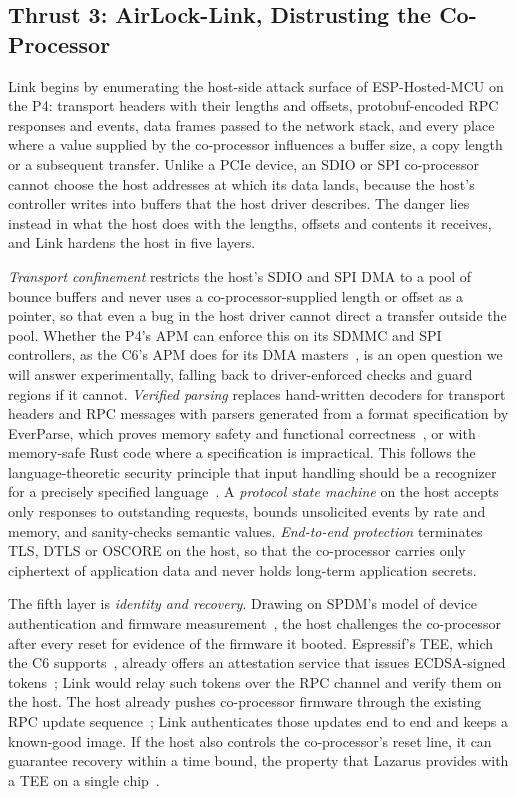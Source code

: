 \documentclass[conference,10pt]{IEEEtran}
\begin{document}
\subsection{Thrust 3: AirLock-Link, Distrusting the Co-Processor}

Link begins by enumerating the host-side attack surface of ESP-Hosted-MCU on the P4: transport headers with their lengths and offsets, protobuf-encoded RPC responses and events, data frames passed to the network stack, and every place where a value supplied by the co-processor influences a buffer size, a copy length or a subsequent transfer. Unlike a PCIe device, an SDIO or SPI co-processor cannot choose the host addresses at which its data lands, because the host's controller writes into buffers that the host driver describes. The danger lies instead in what the host does with the lengths, offsets and contents it receives, and Link hardens the host in five layers.

\emph{Transport confinement} restricts the host's SDIO and SPI DMA to a pool of bounce buffers and never uses a co-processor-supplied length or offset as a pointer, so that even a bug in the host driver cannot direct a transfer outside the pool. Whether the P4's APM can enforce this on its SDMMC and SPI controllers, as the C6's APM does for its DMA masters~\cite{esptee}, is an open question we will answer experimentally, falling back to driver-enforced checks and guard regions if it cannot. \emph{Verified parsing} replaces hand-written decoders for transport headers and RPC messages with parsers generated from a format specification by EverParse, which proves memory safety and functional correctness~\cite{ramananandro2019everparse,swamy2022everparse3d}, or with memory-safe Rust code where a specification is impractical. This follows the language-theoretic security principle that input handling should be a recognizer for a precisely specified language~\cite{sassaman2011halting}. A \emph{protocol state machine} on the host accepts only responses to outstanding requests, bounds unsolicited events by rate and memory, and sanity-checks semantic values. \emph{End-to-end protection} terminates TLS, DTLS or OSCORE on the host, so that the co-processor carries only ciphertext of application data and never holds long-term application secrets.

The fifth layer is \emph{identity and recovery}. Drawing on SPDM's model of device authentication and firmware measurement~\cite{dmtf2023spdm}, the host challenges the co-processor after every reset for evidence of the firmware it booted. Espressif's TEE, which the C6 supports~\cite{espsecframeworks}, already offers an attestation service that issues ECDSA-signed tokens~\cite{espteeguide}; Link would relay such tokens over the RPC channel and verify them on the host. The host already pushes co-processor firmware through the existing RPC update sequence~\cite{esphostedota}; Link authenticates those updates end to end and keeps a known-good image. If the host also controls the co-processor's reset line, it can guarantee recovery within a time bound, the property that Lazarus provides with a TEE on a single chip~\cite{huber2020lazarus}.
\end{document}
